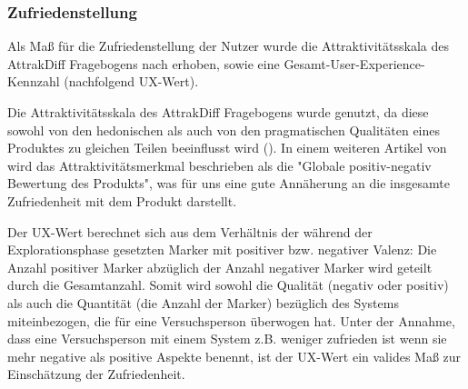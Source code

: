\subsubsection{Zufriedenstellung} 
Als Maß für die Zufriedenstellung der Nutzer wurde die Attraktivitätsskala des AttrakDiff Fragebogens nach \cite{hassenzahl2003attrakdiff} erhoben, sowie eine Gesamt-User-Experience-Kennzahl (nachfolgend UX-Wert).

Die Attraktivitätsskala des AttrakDiff Fragebogens wurde genutzt, da diese sowohl von den hedonischen als auch von den pragmatischen Qualitäten eines Produktes zu gleichen Teilen beeinflusst wird (\cite{hassenzahl2003attrakdiff}). In einem weiteren Artikel von \cite{hassenzahl2008user} wird das Attraktivitätsmerkmal beschrieben als die "Globale positiv-negativ Bewertung des Produkts", was für uns eine gute Annäherung an die insgesamte Zufriedenheit mit dem Produkt darstellt.

Der UX-Wert berechnet sich aus dem Verhältnis der während der Explorationsphase gesetzten Marker mit positiver bzw. negativer Valenz: Die Anzahl positiver Marker abzüglich der Anzahl negativer Marker wird geteilt durch die Gesamtanzahl. Somit wird sowohl die Qualität (negativ oder positiv) als auch die Quantität (die Anzahl der Marker) bezüglich des Systems miteinbezogen, die für eine Versuchsperson überwogen hat. Unter der Annahme, dass eine Versuchsperson mit einem System z.B. weniger zufrieden ist wenn sie mehr negative als positive Aspekte benennt, ist der UX-Wert ein valides Maß zur Einschätzung der Zufriedenheit.